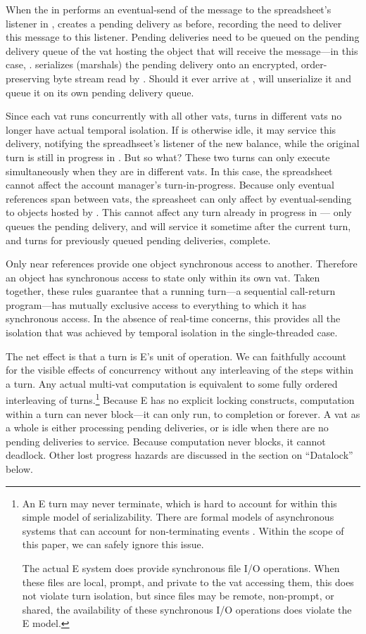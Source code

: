 \documentclass{llncs}
\begin{document}
When the  in  performs an eventual-send of
the  message to the spreadsheet's listener in
,  creates a pending delivery as before, recording the
need to deliver this message to this listener. Pending deliveries need
to be queued on the pending delivery queue of the vat hosting the
object that will receive the message---in this case, . 
serializes (marshals) the pending delivery onto an encrypted,
order-preserving byte stream read by . Should it ever arrive at
,  will unserialize it and queue it on its own pending
delivery queue.

Since each vat runs concurrently with all other vats, turns in
different vats no longer have actual temporal isolation. If  is
otherwise idle, it may service this delivery, notifying the
spreadhseet's listener of the new balance, while the original turn is
still in progress in . But so what? These two turns can only
execute simultaneously when they are in different vats. In this case,
the spreadsheet cannot affect the account manager's
turn-in-progress. Because only eventual references span between vats,
the spreasheet can only affect  by eventual-sending to objects
hosted by . This cannot affect any turn already in progress in
--- only queues the pending delivery, and will service
it sometime after the current turn, and turns for previously queued
pending deliveries, complete.

Only near references provide one object synchronous access to
another. Therefore an object has synchronous access to state only
within its own vat. Taken together, these rules guarantee that a
running turn---a sequential call-return program---has mutually
exclusive access to everything to which it has synchronous access. In
the absence of real-time concerns, this provides all the isolation
that was achieved by temporal isolation in the single-threaded case.

The net effect is that a turn is E's unit of operation. We can
faithfully account for the visible effects of concurrency without any
interleaving of the steps within a turn. Any actual multi-vat
computation is equivalent to some fully ordered interleaving of
turns.\footnote{
%
An E turn may never terminate, which is hard to account for within
this simple model of serializability. There are formal models of
asynchronous systems that can account for non-terminating events
\cite{chandy:snapshots}. Within the scope of this paper, we can safely
ignore this issue.

The actual E system does provide synchronous file I/O operations. When
these files are local, prompt, and private to the vat accessing them,
this does not violate turn isolation, but since files may be remote,
non-prompt, or shared, the availability of these synchronous I/O
operations does violate the E model.}
%
Because E has no explicit locking constructs, computation within a
turn can never block---it can only run, to completion or forever. A
vat as a whole is either processing pending deliveries, or is idle
when there are no pending deliveries to service. Because computation
never blocks, it cannot deadlock.  Other lost progress hazards are
discussed in the section on ``Datalock'' below.
\end{document}

